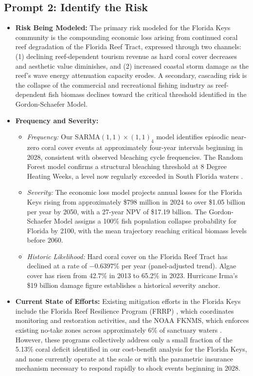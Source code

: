 \documentclass[10pt,letterpaper]{article}
\begin{document}
\subsection*{Prompt 2: Identify the Risk}
\begin{itemize}
    \item \textbf{Risk Being Modeled:} The primary risk modeled for the Florida Keys community is the compounding economic loss arising from continued coral reef degradation of the Florida Reef Tract, expressed through two channels: (1) declining reef-dependent tourism revenue as hard coral cover decreases and aesthetic value diminishes, and (2) increased coastal storm damage as the reef's wave energy attenuation capacity erodes. A secondary, cascading risk is the collapse of the commercial and recreational fishing industry as reef-dependent fish biomass declines toward the critical threshold identified in the Gordon-Schaefer Model.
    \item \textbf{Frequency and Severity:}
    \begin{itemize}
        \item \textit{Frequency:} Our SARMA$(1,1)\times(1,1)_4$ model identifies episodic near-zero coral cover events at approximately four-year intervals beginning in 2028, consistent with observed bleaching cycle frequencies. The Random Forest model confirms a structural bleaching threshold at 8 Degree Heating Weeks, a level now regularly exceeded in South Florida waters \cite{noaa_crw}.
        \item \textit{Severity:} The economic loss model projects annual losses for the Florida Keys rising from approximately \$798 million in 2024 to over \$1.05 billion per year by 2050, with a 27-year NPV of \$17.19 billion. The Gordon-Schaefer Model assigns a 100\% fish population collapse probability for Florida by 2100, with the mean trajectory reaching critical biomass levels before 2060.
        \item \textit{Historic Likelihood:} Hard coral cover on the Florida Reef Tract has declined at a rate of $-0.6397\%$ per year (panel-adjusted trend). Algae cover has risen from 42.7\% in 2013 to 65.2\% in 2023. Hurricane Irma's \$19 billion damage figure establishes a historical severity anchor.
    \end{itemize}
    \item \textbf{Current State of Efforts:} Existing mitigation efforts in the Florida Keys include the Florida Reef Resilience Program (FRRP) \cite{frrp}, which coordinates monitoring and restoration activities, and the NOAA FKNMS, which enforces existing no-take zones across approximately 6\% of sanctuary waters \cite{noaa_fknms}. However, these programs collectively address only a small fraction of the 5.13\% coral deficit identified in our cost-benefit analysis for the Florida Keys, and none currently operate at the scale or with the parametric insurance mechanism necessary to respond rapidly to shock events beginning in 2028.
\end{itemize}
\end{document}

